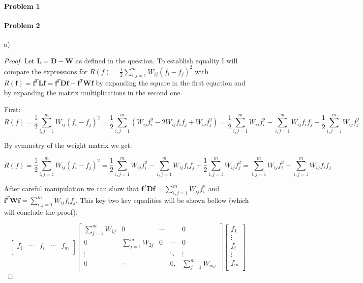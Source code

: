\documentclass[12pt]{report}
\begin{document}
\maketitle

\paragraph{Problem 1}

\paragraph{Problem 2}
a)

\begin{proof} Let $\mathbf{L} = \mathbf{D} - \mathbf{W}$ as defined in the question. 
To establish equality I will compare the expressions for $R(f) = \frac{1}{2}\sum^m_{i,j=1} W_{ij}(f_i - f_j)^2$ with $R(\mathbf{f}) = \mathbf{f}^T\mathbf{L}\mathbf{f} = \mathbf{f}^T\mathbf{D}\mathbf{f} - \mathbf{f}^T\mathbf{W}\mathbf{f} $ by expanding the square in the first equation and by expanding the matrix multiplications in the second one.

First:
 $$R(f) = \frac{1}{2}\sum^m_{i,j=1} W_{ij}(f_i - f_j)^2 = \frac{1}{2}\sum^m_{i,j=1} (W_{ij}f_i^2 -2W_{ij}f_if_j + W_{ij}f_j^2) = \frac{1}{2}\sum^m_{i,j=1} W_{ij}f_i^2 -\sum^m_{i,j=1}W_{ij}f_if_j + \frac{1}{2}\sum^m_{i,j=1}W_{ij}f_j^2 $$
 
 By symmetry of the weight matrix we get:
 
 $$R(f) = \frac{1}{2}\sum^m_{i,j=1} W_{ij}(f_i - f_j)^2 = \frac{1}{2}\sum^m_{i,j=1} W_{ij}f_i^2 -\sum^m_{i,j=1}W_{ij}f_if_j + \frac{1}{2}\sum^m_{i,j=1}W_{ij}f_j^2 = \sum^m_{i,j=1} W_{ij}f_i^2 -\sum^m_{i,j=1}W_{ij}f_if_j  $$
  
After careful manipulation we can show that 
$\mathbf{f}^T\mathbf{D}\mathbf{f} =  \sum^m_{i,j=1} W_{ij}f_i^2 $ 
and 
$\mathbf{f}^T\mathbf{W}\mathbf{f} = \sum^m_{i,j=1}W_{ij}f_if_j $. This key two key equalities will be shown bellow (which will conclude the proof):
  
$$
\begin{bmatrix}
f_1& \cdots & f_i & \cdots & f_m\\
\end{bmatrix} 
\begin{bmatrix}
\sum_{j=1}^{m}W_{1j} & 0 & \cdots &  & 0 \\
0 & \sum_{j=1}^{m}W_{2j} & 0 & \cdots  & 0 \\
\vdots &   &  &  \ddots  & \vdots \\
0 & \cdots &  & 0, & \sum_{j=1}^{m}W_{mj}
\end{bmatrix} 
\begin{bmatrix}
f_1\\ 
\vdots \\
f_i \\
\vdots \\
f_m\\
\end{bmatrix}
$$



\end{proof}
\end{document}
